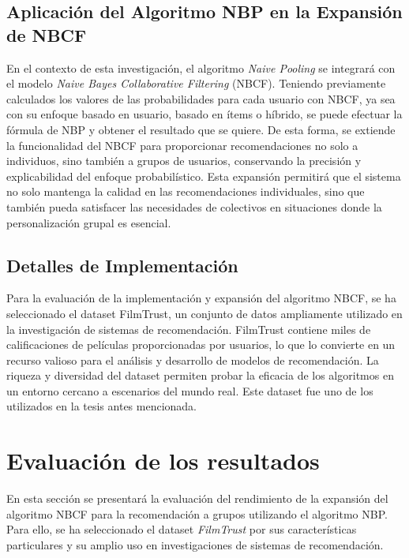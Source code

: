 \documentclass[runningheads,a4paper]{llncs}
\begin{document}
\subsection{Aplicación del Algoritmo NBP en la Expansión de NBCF}

En el contexto de esta investigación, el algoritmo 
\textit{Naive Pooling} se integrará con el modelo 
\textit{Naive Bayes Collaborative Filtering} (NBCF). 
Teniendo previamente calculados los valores de las 
probabilidades para cada usuario con NBCF, ya sea con 
su enfoque basado en usuario, basado en ítems o híbrido,
se puede efectuar la fórmula de NBP y obtener el resultado 
que se quiere. De esta forma, se extiende 
la funcionalidad del NBCF para proporcionar 
recomendaciones no solo a individuos, sino también a 
grupos de usuarios, conservando la precisión y 
explicabilidad del enfoque probabilístico. 
Esta expansión permitirá que el sistema no solo 
mantenga la calidad en las recomendaciones 
individuales, sino que también pueda satisfacer las 
necesidades de colectivos en situaciones donde la 
personalización grupal es esencial.

\subsection{Detalles de Implementación}

Para la evaluación de la implementación y expansión 
del algoritmo NBCF, se ha seleccionado el dataset 
FilmTrust\cite{filmtrust}, un conjunto de datos ampliamente utilizado 
en la investigación de sistemas de recomendación. 
FilmTrust contiene miles de calificaciones de 
películas proporcionadas por usuarios, lo que lo 
convierte en un recurso valioso para el análisis y 
desarrollo de modelos de recomendación. 
La riqueza y diversidad del dataset permiten probar 
la eficacia de los algoritmos en un entorno 
cercano a escenarios del mundo real. 
Este dataset fue uno de los utilizados en la tesis antes mencionada.


\section{Evaluación de los resultados}

En esta sección se presentará la evaluación del 
rendimiento de la expansión del algoritmo NBCF para 
la recomendación a grupos utilizando el algoritmo NBP. 
Para ello, se ha seleccionado el dataset \textit{FilmTrust}
 por sus características particulares y su amplio uso 
 en investigaciones de sistemas de recomendación.
\end{document}
